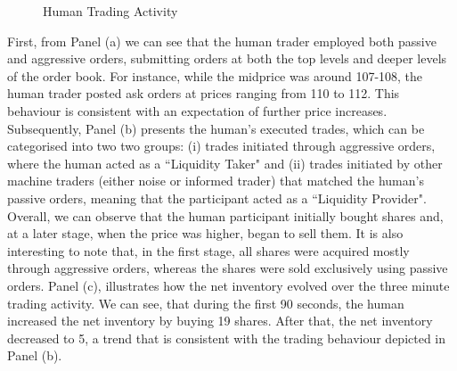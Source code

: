 \begin{figure}[!htbp]
    \caption{Human Trading Activity}
    \label{fig:human_trading_activity}
\end{figure}

First, from Panel (a) we can see that the human trader employed both passive and aggressive orders, submitting orders at both the top levels and deeper levels of the order book. For instance, while the midprice was around 107-108, the human trader posted ask orders at prices ranging from 110 to 112. This behaviour is consistent  with an expectation of further price increases. Subsequently, Panel (b) presents the human's executed trades, which can be categorised into two two groups: (i) trades initiated through aggressive orders, where the human acted as a ``Liquidity Taker" and (ii) trades initiated by other machine traders (either noise or informed trader) that matched the human's passive orders, meaning that the participant acted as a ``Liquidity Provider". Overall, we can observe that the human participant initially bought shares and, at a later stage, when the price was higher, began to sell them. It is also interesting to note that, in the first stage, all shares were acquired mostly through aggressive orders, whereas the shares were sold exclusively using passive orders. Panel (c), illustrates how the net inventory evolved over the three minute trading activity. We can see, that during the first 90 seconds, the human increased the net inventory by buying 19 shares. After that, the net inventory decreased to 5, a trend that is consistent with the trading behaviour depicted in Panel (b).

